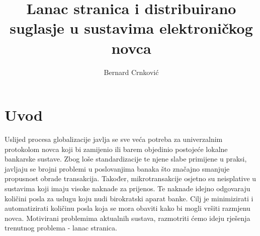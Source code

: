 \documentclass[utf8, zavrsni]{fer}
\begin{document}

\title{Lanac stranica i distribuirano suglasje u sustavima elektroničkog novca}

\author{Bernard Crnković}

\maketitle


\zahvala{}

\tableofcontents

\chapter{Uvod}
Uslijed procesa globalizacije javlja se sve veća potreba za univerzalnim protokolom novca koji bi zamijenio ili barem objedinio postojeće lokalne bankarske sustave. Zbog loše standardizacije te njene slabe primijene u praksi, javljaju se brojni problemi u poslovanjima banaka što značajno smanjuje propusnost obrade transakcija. Također, mikrotransakcije osjetno su neisplative u sustavima koji imaju visoke naknade za prijenos. Te naknade idejno odgovaraju količini posla za uslugu koju nudi birokratski aparat banke. Cilj je minimizirati i automatizirati količinu posla koja se mora obaviti kako bi mogli vršiti razmjenu novca. Motivirani problemima aktualnih sustava, razmotriti ćemo ideju rješenja trenutnog problema - lanac stranica.
\end{document}
